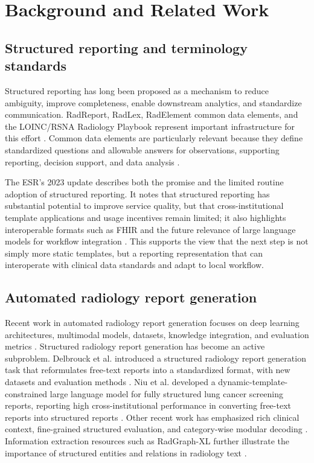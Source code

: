 \documentclass[11pt]{article}
\begin{document}
\section{Background and Related Work}

\subsection{Structured reporting and terminology standards}
Structured reporting has long been proposed as a mechanism to reduce ambiguity, improve completeness, enable downstream analytics, and standardize communication. RadReport, RadLex, RadElement common data elements, and the LOINC/RSNA Radiology Playbook represent important infrastructure for this effort \cite{RSNARadReport,RSNARadLex,LOINCRSNAPlaybook}. Common data elements are particularly relevant because they define standardized questions and allowable answers for observations, supporting reporting, decision support, and data analysis \cite{RSNARadElement}.

The ESR's 2023 update describes both the promise and the limited routine adoption of structured reporting. It notes that structured reporting has substantial potential to improve service quality, but that cross-institutional template applications and usage incentives remain limited; it also highlights interoperable formats such as FHIR and the future relevance of large language models for workflow integration \cite{ESR2023}. This supports the view that the next step is not simply more static templates, but a reporting representation that can interoperate with clinical data standards and adapt to local workflow.

\subsection{Automated radiology report generation}
Recent work in automated radiology report generation focuses on deep learning architectures, multimodal models, datasets, knowledge integration, and evaluation metrics \cite{Sloan2024ARRG}. Structured radiology report generation has become an active subproblem. Delbrouck et al. introduced a structured radiology report generation task that reformulates free-text reports into a standardized format, with new datasets and evaluation methods \cite{Delbrouck2025SRRG}. Niu et al. developed a dynamic-template-constrained large language model for fully structured lung cancer screening reports, reporting high cross-institutional performance in converting free-text reports into structured reports \cite{Niu2024DynamicTemplate}. Other recent work has emphasized rich clinical context, fine-grained structured evaluation, and category-wise modular decoding \cite{Kang2025Context,Li2025SRRGBench,Srivastava2026CWCD}. Information extraction resources such as RadGraph-XL further illustrate the importance of structured entities and relations in radiology text \cite{Delbrouck2024RadGraphXL}.
\end{document}
